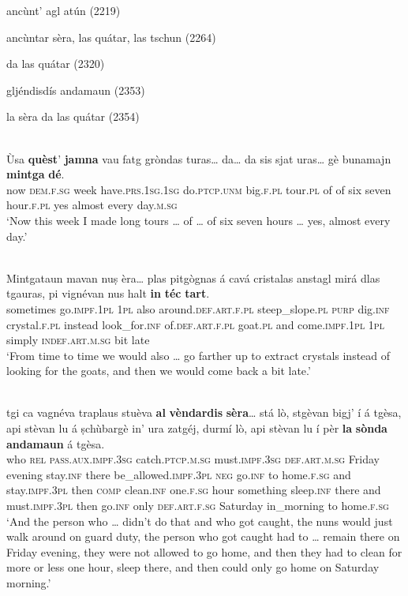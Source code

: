 ancùnt' agl atún (2219)

ancùntar sèra, las quátar, las tschun (2264)

da las quátar (2320)

gljéndisdís andamaun (2353)

la sèra da las quátar (2354)


\ea
\label{}
\\
\gll Ùsa \textbf{quèst}’ \textbf{jamna} vau fatg gròndas turas… da… da sis sjat uras… gè bunamajn \textbf{mintga} \textbf{dé}.  \\
now \textsc{dem.f.sg} week have.\textsc{prs.1sg.1sg} do.\textsc{ptcp.unm} big.\textsc{f.pl} tour.\textsc{pl} of of six seven hour.\textsc{f.pl} yes almost every day.\textsc{m.sg}  \\
\glt `Now this week I made long tours … of … of six seven hours … yes, almost every day.'
\z

\ea
\label{}
\\
\gll Mintgataun mavan nuṣ èra… plas pitgògnas á cavá cristalas anstagl mirá dlas tgauras, pi vignévan nus halt \textbf{in} \textbf{téc} \textbf{tart}. \\
sometimes go.\textsc{impf.1pl} \textsc{1pl} also around.\textsc{def.art.f.pl}  steep\_slope.\textsc{pl} \textsc{purp} dig.\textsc{inf} crystal.\textsc{f.pl} instead look\_for.\textsc{inf} of.\textsc{def.art.f.pl} goat.\textsc{pl} and come.\textsc{impf.1pl} \textsc{1pl} simply \textsc{indef.art.m.sg} bit late \\
\glt `From time to time we would also … go farther up to extract crystals instead of looking for the goats, and then we would come back a bit late.'
\z


\ea\label{}
\\
\gll    [...] tgi ca vagnéva traplaus stuèva \textbf{al} \textbf{vèndardis} \textbf{sèra}… stá lò, stgèvan bigj’ í á tgèsa, api stèvan lu á ṣchùbargè in’ ura zatgéj, durmí lò, api stèvan lu í pèr \textbf{la} \textbf{sònda} \textbf{andamaun} á tgèsa.\\
{} who \textsc{rel} \textsc{pass.aux.impf.3sg} catch.\textsc{ptcp.m.sg} must.\textsc{impf.3sg} \textsc{def.art.m.sg} Friday evening stay.\textsc{inf} there be\_allowed.\textsc{impf.3pl} \textsc{neg} go.\textsc{inf} to home.\textsc{f.sg} and stay.\textsc{impf.3pl} then \textsc{comp} clean.\textsc{inf} one.\textsc{f.sg} hour something sleep.\textsc{inf} there and must.\textsc{impf.3pl} then go.\textsc{inf} only \textsc{def.art.f.sg} Saturday in\_morning to home.\textsc{f.sg}\\
\glt `And the person who … didn’t do that and who got caught, the nuns would just walk around on guard duty, the person who got caught had to … remain there on Friday evening, they were not allowed to go home, and then they had to clean for more or less one hour, sleep there, and then could only go home on Saturday morning.'
\z

